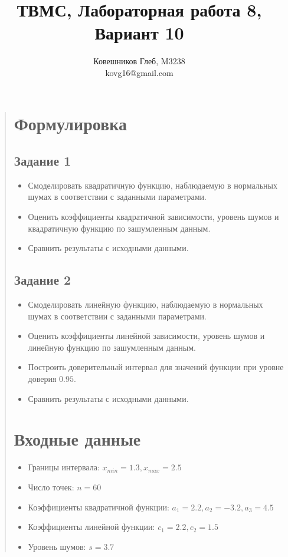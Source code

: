 \documentclass{article}
\begin{document}
\title{ТВМС, Лабораторная работа 8, Вариант 10}
\author{
	Ковешников Глеб, M3238\\
	kovg16@gmail.com
}
\maketitle

\begin{quote}
\section{Формулировка}
\subsection{Задание 1}
  \begin{itemize}
    \item Смоделировать квадратичную функцию, наблюдаемую в нормальных шумах в соответствии с заданными параметрами.
    \item Оценить коэффициенты квадратичной зависимости, уровень шумов и квадратичную функцию по зашумленным данным.
    \item Сравнить результаты с исходными данными.
  \end{itemize}
\subsection{Задание 2}
  \begin{itemize}
    \item Смоделировать линейную функцию, наблюдаемую в нормальных шумах в соответствии с заданными параметрами.
    \item Оценить коэффициенты линейной зависимости, уровень шумов и линейную функцию по зашумленным данным.
    \item Построить доверительный интервал для значений функции при уровне доверия $0.95$.
    \item Сравнить результаты с исходными данными.
  \end{itemize}
\section{Входные данные}
  \begin{itemize}
    \item Границы интервала: $x_{min} = 1.3, x_{max} = 2.5$
    \item Число точек: $n = 60$
    \item Коэффициенты квадратичной функции: $a_1 = 2.2, a_2 = -3.2, a_3 = 4.5$
    \item Коэффициенты линейной функции: $c_1 = 2.2, c_2 = 1.5$
    \item Уровень шумов: $s = 3.7$
  \end{itemize}

\end{quote}
\end{document}
